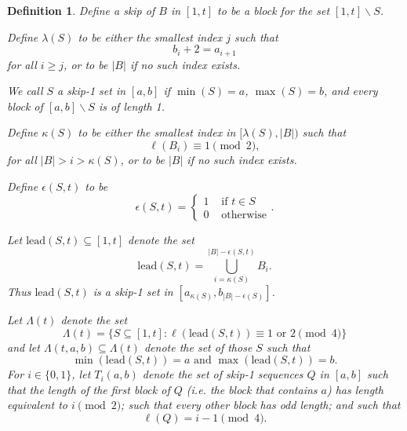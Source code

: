 \documentclass[11pt, oneside]{article}   	%
\newtheorem{definition}{Definition}
\begin{document}
\begin{definition} 
 Define a \emph{skip} of $B$ in $[1,t]$ to be a block for the set $[1,t] \backslash S$.  

Define $\lambda(S)$ to be either the smallest index $j$ such that 
\[
b_{i}+ 2 = a_{i+1}
\]
for all $i \geq j$, or to be $|B|$ if no such index exists.  

We call $S$ a \emph{skip-1 set in $[a,b]$} if $\min(S)=a$, $\max(S) = b$, and every block of $[a,b] \backslash S$ is of length 1. 

Define $\kappa(S)$ to be either the smallest index in $ [\lambda(S), |B|)$ such that 
\[
\ell(B_i) \equiv 1 \pmod 2, 
\]
for all $|B|>i >\kappa(S)$, or to be $|B|$ if no such index exists. 

Define $\epsilon(S,t)$ to be 
\[
\epsilon(S,t) = \begin{cases} 
1 &\text{ if } t \in S \\ 
0 &\text{ otherwise}
\end{cases}.
\]

Let $\mathrm{lead}(S,t) \subseteq [1,t]$ denote the set 
\[
\mathrm{lead}(S,t) =\bigcup_{i=\kappa(S)}^{|B|- \epsilon(S, t)} B_i.
\]
Thus $\mathrm{lead}(S,t)$ is a skip-1 set in $[a_{\kappa(S)}, b_{|B|-\epsilon(S)}]$. 

Let $\Lambda(t)$ denote the set  
\[
\Lambda(t) = \{ S \subseteq [1,t] \colon \ell(\mathrm{lead}(S,t)) \equiv 1 \text{ or } 2 \pmod 4 \}
\]
and let $\Lambda(t, a,b) \subseteq \Lambda(t)$ denote the set of those $S$ such that 
\[
\min(\mathrm{lead}(S,t)) = a \text{ and } \max(\mathrm{lead}(S,t)) = b.
\]
For $i \in \{ 0,1\}$, let $T_i(a,b)$ denote the set of skip-1 sequences $Q$ in $[a,b]$ such that the length of the first block of $Q$ (i.e. the block that contains $a$) has length equivalent to $i \pmod 2$; such that every other block has odd length; and such that 
\[
\ell(Q) = i-1 \pmod 4. 
\]

\end{definition}
\end{document}
